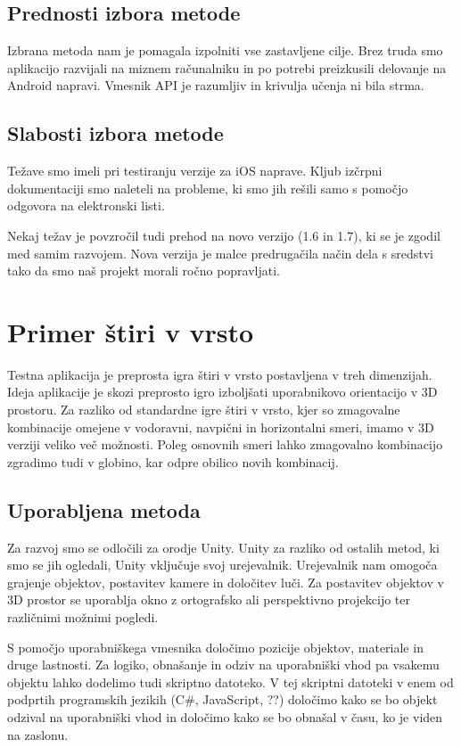 \subsection{Prednosti izbora metode}

Izbrana metoda nam je pomagala izpolniti vse zastavljene cilje. Brez truda smo aplikacijo razvijali na miznem računalniku in po potrebi preizkusili delovanje na Android napravi. Vmesnik API je razumljiv in krivulja učenja ni bila strma. 

\subsection{Slabosti izbora metode}

Težave smo imeli pri testiranju verzije za iOS naprave. Kljub izčrpni dokumentaciji smo naleteli na probleme, ki smo jih rešili samo s pomočjo odgovora na elektronski listi. 

Nekaj težav je povzročil tudi prehod na novo verzijo (1.6 in 1.7), ki se je zgodil med samim razvojem. Nova verzija je malce predrugačila način dela s sredstvi tako da smo naš projekt morali ročno popravljati.

\section{Primer štiri v vrsto}

Testna aplikacija je preprosta igra štiri v vrsto postavljena v treh dimenzijah. Ideja aplikacije je skozi preprosto igro izboljšati uporabnikovo orientacijo v 3D prostoru. Za razliko od standardne igre štiri v vrsto, kjer so zmagovalne kombinacije omejene v vodoravni, navpični in horizontalni smeri, imamo v 3D verziji veliko več možnosti. Poleg osnovnih smeri lahko zmagovalno kombinacijo zgradimo tudi v globino, kar odpre obilico novih kombinacij.

\subsection{Uporabljena metoda}

Za razvoj smo se odločili za orodje Unity. Unity za razliko od ostalih metod, ki smo se jih ogledali, Unity vključuje svoj urejevalnik. Urejevalnik nam omogoča grajenje objektov, postavitev kamere in določitev luči. Za postavitev objektov v 3D prostor se uporablja okno z ortografsko ali perspektivno projekcijo ter različnimi možnimi pogledi. 

S pomočjo uporabniškega vmesnika določimo pozicije objektov, materiale in druge lastnosti. Za logiko, obnašanje in odziv na uporabniški vhod pa vsakemu objektu lahko dodelimo tudi skriptno datoteko. V tej skriptni datoteki v enem od podprtih programskih jezikih (C\#, JavaScript, ??) določimo kako se bo objekt odzival na uporabniški vhod in določimo kako se bo obnašal v času, ko je viden na zaslonu.

